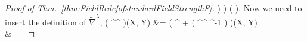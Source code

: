 \begin{proof}[Proof of Thm.~\ref{thm:FieldRedefofstandardFieldStrengthF}]
\mright) \Biggr) \mleft( \Phi \stackrel{\wedge}{,}  \Phi \mright).
\eas
Now we need to insert the definition of $\widetilde{\nabla}^\lambda$,
\bas
\mleft( ^{\widetilde{\nabla}^\lambda} \lambda \mright)(X, Y)
&=
\mleft( ^{
		\nabla
	+ \mleft( \Lambda \circ {}^{\nabla^{}} \circ \Lambda^{-1} \mright) \lambda} \lambda \mright)(X, Y)
\\
&~~~

\end{proof}
